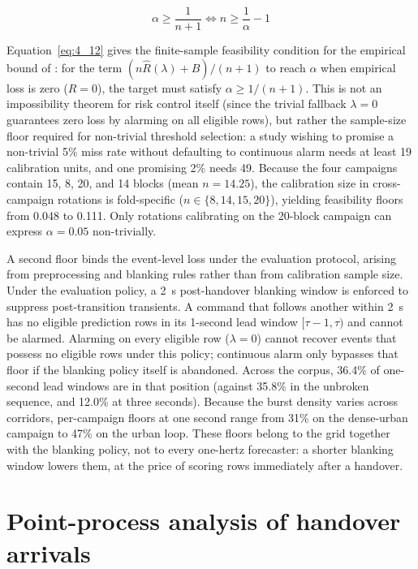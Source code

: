 \begin{equation}\label{eq:4_12} \alpha \ge \frac{1}{n+1} \iff n \ge \frac{1}{\alpha} - 1 \end{equation}

Equation~\eqref{eq:4_12} gives the finite-sample feasibility condition for the empirical bound of \cite{ref21}: for the term $(n \hat{R}(\lambda) + B)/(n+1)$ to reach $\alpha$ when empirical loss is zero ($\hat{R} = 0$), the target must satisfy $\alpha \ge 1/(n+1)$. This is not an impossibility theorem for risk control itself (since the trivial fallback $\lambda = 0$ guarantees zero loss by alarming on all eligible rows), but rather the sample-size floor required for non-trivial threshold selection: a study wishing to promise a non-trivial 5\% miss rate without defaulting to continuous alarm needs at least 19 calibration units, and one promising 2\% needs 49. Because the four campaigns contain 15, 8, 20, and 14 blocks (mean $n = 14.25$), the calibration size in cross-campaign rotations is fold-specific ($n \in \{8, 14, 15, 20\}$), yielding feasibility floors from 0.048 to 0.111. Only rotations calibrating on the 20-block campaign can express $\alpha = 0.05$ non-trivially.

A second floor binds the event-level loss under the evaluation protocol, arising from preprocessing and blanking rules rather than from calibration sample size. Under the evaluation policy, a 2~s post-handover blanking window is enforced to suppress post-transition transients. A command that follows another within 2~s has no eligible prediction rows in its 1-second lead window $[\tau - 1, \tau)$ and cannot be alarmed. Alarming on every eligible row ($\lambda = 0$) cannot recover events that possess no eligible rows under this policy; continuous alarm only bypasses that floor if the blanking policy itself is abandoned. Across the corpus, 36.4\% of one-second lead windows are in that position (against 35.8\% in the unbroken sequence, and 12.0\% at three seconds). Because the burst density varies across corridors, per-campaign floors at one second range from 31\% on the dense-urban campaign to 47\% on the urban loop. These floors belong to the grid together with the blanking policy, not to every one-hertz forecaster: a shorter blanking window lowers them, at the price of scoring rows immediately after a handover.


\section{Point-process analysis of handover arrivals}
\label{sec:4_11}

